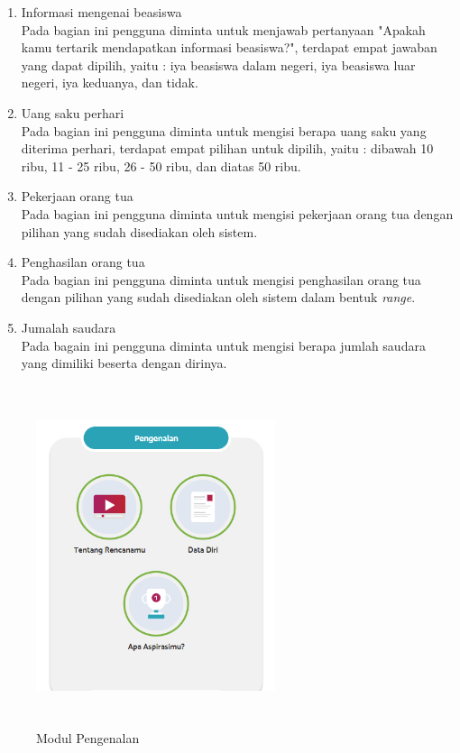 \begin{enumerate}
\begin{enumerate}
\begin{enumerate}
                \item Informasi mengenai beasiswa\\
                    Pada bagian ini pengguna diminta untuk menjawab pertanyaan "Apakah kamu tertarik mendapatkan informasi beasiswa?", terdapat empat jawaban yang dapat dipilih, yaitu : iya beasiswa dalam negeri, iya beasiswa luar negeri, iya keduanya, dan tidak.
                    
                \item Uang saku perhari\\
                    Pada bagian ini pengguna diminta untuk mengisi berapa uang saku yang diterima perhari, terdapat empat pilihan untuk dipilih, yaitu : dibawah 10 ribu, 11 - 25 ribu, 26 - 50 ribu, dan diatas 50 ribu.
                    
                \item Pekerjaan orang tua\\
                    Pada bagian ini pengguna diminta untuk mengisi pekerjaan orang tua dengan pilihan yang sudah disediakan oleh sistem.
                    
                \item Penghasilan orang tua\\
                    Pada bagian ini pengguna diminta untuk mengisi penghasilan orang tua dengan pilihan yang sudah disediakan oleh sistem dalam bentuk \textit{range}.
                    
                \item Jumalah saudara \\
                    Pada bagain ini pengguna diminta untuk mengisi berapa jumlah saudara yang dimiliki beserta dengan dirinya.
                
            \end{enumerate}
    \end{enumerate}
    
    \begin{figure}[H]
        \centering
        \includegraphics[width = 7cm, height = 10cm ]{Gambar/gambar33.PNG}
        \caption{Modul Pengenalan}
        \label{fig:modul pengenalan}
    \end{figure}
    

\end{enumerate}
